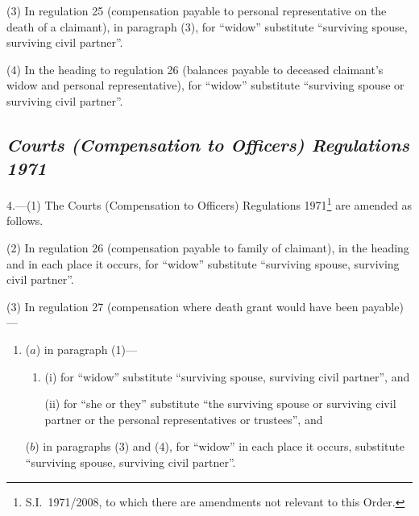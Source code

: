 \documentclass[12pt,a4paper]{article}
\begin{document}
(3) In regulation 25 (compensation payable to personal representative on the death of a claimant), in paragraph (3), for “widow” substitute “surviving spouse, surviving civil partner”.

(4) In the heading to regulation 26 (balances payable to deceased claimant’s widow and personal representative), for “widow” substitute “surviving spouse or surviving civil partner”.

\subsection*{\itshape Courts (Compensation to Officers) Regulations 1971}

4.—(1) The Courts (Compensation to Officers) Regulations 1971\footnote{S.I.~1971/2008, to which there are amendments not relevant to this Order.} are amended as follows.

(2) In regulation 26 (compensation payable to family of claimant), in the heading and in each place it occurs, for “widow” substitute “surviving spouse, surviving civil partner”.

\begin{sloppypar}
(3) In regulation 27 (compensation where death grant would have been payable)—
\end{sloppypar}
\begin{enumerate}\item[]
($a$) in paragraph (1)—
\begin{enumerate}\item[]
(i) for “widow” substitute “surviving spouse, surviving civil partner”, and

(ii) for “she or they” substitute “the surviving spouse or surviving civil partner or the personal representatives or trustees”, and
\end{enumerate}

($b$) in paragraphs (3) and (4), for “widow” in each place it occurs, substitute “surviving spouse, surviving civil partner”.
\end{enumerate}
\end{document}
